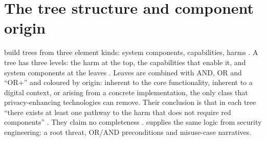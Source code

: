 \section{The tree structure and component origin}
 build trees from three element kinds: system components, capabilities, harms . A tree has three levels: the harm at the top, the capabilities that enable it, and system components at the leaves . Leaves are combined with AND, OR and ``OR+'' and coloured by origin: inherent to the core functionality, inherent to a digital context, or arising from a concrete implementation, the only class that privacy-enhancing technologies can remove. Their conclusion is that in each tree ``there exists at least one pathway to the harm that does not require red components'' . They claim no completeness .  supplies the same logic from security engineering: a root threat, OR/AND preconditions and misuse-case narratives.

